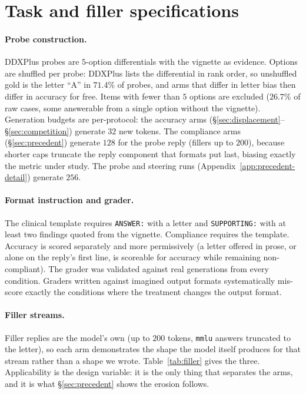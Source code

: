 \documentclass{article}
\begin{document}
\section{Task and filler specifications}
\label{app:tasks}

\paragraph{Probe construction.}
DDXPlus probes are $5$-option differentials with the vignette as evidence. Options are shuffled
per probe: DDXPlus lists the differential in rank order, so unshuffled gold is the letter ``A''
in $71.4\%$ of probes, and arms that differ in letter bias then differ in accuracy for free.
Items with fewer than $5$ options are excluded ($26.7\%$ of raw cases, some answerable from
a single option without the vignette). Generation budgets are per-protocol: the accuracy arms
(\S\ref{sec:displacement}--\S\ref{sec:competition}) generate $32$ new tokens. The compliance
arms (\S\ref{sec:precedent}) generate $128$ for the probe reply (fillers up to $200$), because
shorter caps truncate the reply component that formats put last, biasing exactly the metric
under study. The probe and steering runs (Appendix~\ref{app:precedent-detail}) generate $256$.

\paragraph{Format instruction and grader.}
The clinical template requires \texttt{ANSWER:} with a letter and \texttt{SUPPORTING:} with at
least two findings quoted from the vignette. Compliance requires the template. Accuracy is
scored separately and more permissively (a letter offered in prose, or alone on the reply's
first line, is scoreable for accuracy while remaining non-compliant). The grader was validated
against real generations from every condition. Graders written against imagined output formats
systematically mis-score exactly the conditions where the treatment changes the output format.

\paragraph{Filler streams.}
Filler replies are the model's own (up to $200$ tokens, \texttt{mmlu} answers truncated to the
letter), so each arm demonstrates the shape the model itself produces for that stream rather
than a shape we wrote. Table~\ref{tab:filler} gives the three. Applicability is the design
variable: it is the only thing that separates the arms, and it is what \S\ref{sec:precedent}
shows the erosion follows.
\end{document}
